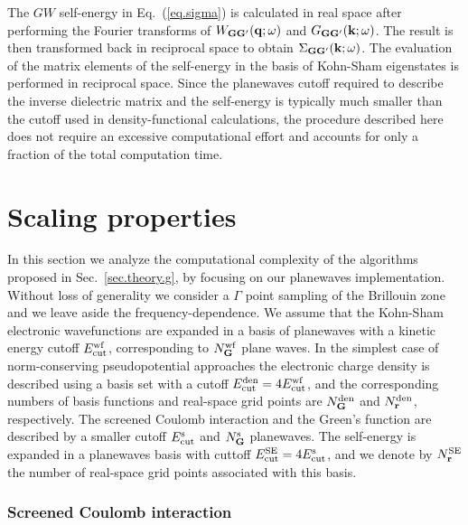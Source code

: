 \documentclass[twocolumn,prb,showpacs,superscriptaddress]{revtex4}
\def\w{\omega}
\def\q{{\bf q}}
\def\k{{\bf k}}
\def\G{{\bf G}}
\def\Gp{{\bf G^\prime}}
\def\r{{\bf r}}
\begin{document}
The $GW$ self-energy in Eq.\ (\ref{eq.sigma}) is calculated in real space
after performing the Fourier transforms of $W_{\G\Gp}(\q;\w)$ and $G_{\G\Gp}(\k;\w)$.
The result is then transformed back in reciprocal space to obtain
$\Sigma_{\G\Gp}(\k;\w)$. The evaluation of the matrix elements of the
self-energy in the basis of Kohn-Sham eigenstates is performed in reciprocal space.
Since the planewaves cutoff required to describe the inverse dielectric
matrix and the self-energy is typically much smaller than the cutoff used
in density-functional calculations,\cite{hl86} the procedure described here 
does not require an excessive computational effort and accounts for only
a fraction of the total computation time.

\section{Scaling properties}\label{sec.scaling}

In this section we analyze the computational complexity of the algorithms
proposed in Sec.\ \ref{sec.theory.g}, by focusing on our planewaves
implementation. Without loss of generality we consider a $\Gamma$ point sampling 
of the Brillouin zone and we leave aside the frequency-dependence.
We assume that the Kohn-Sham electronic wavefunctions are expanded in a basis of planewaves
with a kinetic energy cutoff $E_{\rm cut}^{\rm wf}$, corresponding to
$N_\G^{\rm wf}$ plane waves.
In the simplest case of norm-conserving pseudopotential approaches 
the electronic charge density is described using a basis set with a cutoff
$E_{\rm cut}^{\rm den}=4E_{\rm cut}^{\rm wf}$, and the corresponding numbers 
of basis functions and real-space grid points are $N_\G^{\rm den}$ and
$N_\r^{\rm den}$, respectively. The screened Coulomb interaction and the Green's function
are described by a smaller cutoff $E_{\rm cut}^{\rm s}$ and $N_\G^{\rm s}$
planewaves. The self-energy is expanded in a planewaves basis with cuttoff
$E_{\rm cut}^{\rm SE}=4E_{\rm cut}^{\rm s}$, and we denote by $N_\r^{\rm SE}$
the number of real-space grid points associated with this basis.

\subsubsection{Screened Coulomb interaction}\label{sec.coulomb.scaling}
\end{document}
